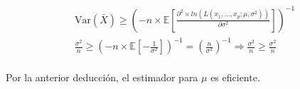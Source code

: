 \documentclass[../main.tex]{subfiles}
\begin{document}
\begin{enumerate}[(a)]
\begin{equation}
\begin{split}
\text{Var}(\bar{X}) \geq \left( -n \times \mathbb{E} \left[ \frac{\partial ^2 \times ln(L(x_1, \dots, x_p; 	\mu, \sigma ^2))}{\partial \sigma ^2} \right]\right)^{-1} \\
\frac{\sigma ^2}{n} \geq \left( -n \times \mathbb{E} \left[ -\frac{1}{\sigma ^2} \right]\right)^{-1} =  \left(\frac{n}{\sigma ^2}\right)^{-1} \Rightarrow \frac{\sigma ^2}{n} \geq \frac{\sigma ^2}{n}\\
\end{split}
\end{equation}

Por la anterior deducción, el estimador para $\mu$ es eficiente.

\end{enumerate}
\end{document}
